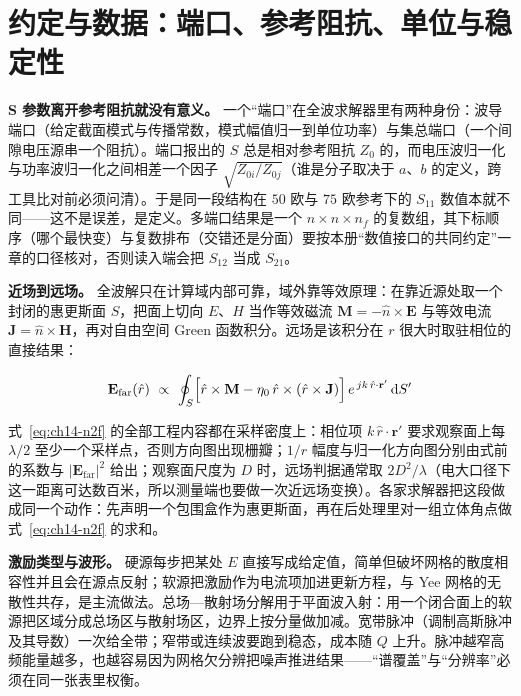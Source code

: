 \documentclass[12pt,a4paper,fontset=fandol]{ctexbook}
\begin{document}
\section{约定与数据：端口、参考阻抗、单位与稳定性}

\textbf{S 参数离开参考阻抗就没有意义。} 一个``端口''在全波求解器里有两种身份：波导端口（给定截面模式与传播常数，模式幅值归一到单位功率）与集总端口（一个间隙电压源串一个阻抗）。端口报出的 $S$ 总是相对参考阻抗 $Z_0$ 的，而电压波归一化与功率波归一化之间相差一个因子 $\sqrt{Z_{0i}/Z_{0j}}$（谁是分子取决于 $a$、$b$ 的定义，跨工具比对前必须问清）。于是同一段结构在 $50$ 欧与 $75$ 欧参考下的 $S_{11}$ 数值本就不同——这不是误差，是定义。多端口结果是一个 $n \times n \times n_f$ 的复数组，其下标顺序（哪个最快变）与复数排布（交错还是分面）要按本册``数值接口的共同约定''一章的口径核对，否则读入端会把 $S_{12}$ 当成 $S_{21}$。

\textbf{近场到远场。} 全波解只在计算域内部可靠，域外靠等效原理：在靠近源处取一个封闭的惠更斯面 $S$，把面上切向 $E$、$H$ 当作等效磁流 $\mathbf{M} = -\hat n \times \mathbf{E}$ 与等效电流 $\mathbf{J} = \hat n \times \mathbf{H}$，再对自由空间 Green 函数积分。远场是该积分在 $r$ 很大时取驻相位的直接结果：

\begin{equation}
\mathbf{E}_{\text{far}}(\hat r) \ \propto\ \oint_{S}
\Bigl[\hat r \times \mathbf{M}
- \eta_0\, \hat r \times (\hat r \times \mathbf{J})\Bigr]\,
e^{\,j k\, \hat r \cdot \mathbf{r}'}\, \mathrm{d}S'
\label{eq:ch14-n2f}
\end{equation}

式~\eqref{eq:ch14-n2f} 的全部工程内容都在采样密度上：相位项 $k\,\hat r \cdot \mathbf{r}'$ 要求观察面上每 $\lambda/2$ 至少一个采样点，否则方向图出现栅瓣；$1/r$ 幅度与归一化方向图分别由式前的系数与 $|\mathbf{E}_{\text{far}}|^{2}$ 给出；观察面尺度为 $D$ 时，远场判据通常取 $2D^{2}/\lambda$（电大口径下这一距离可达数百米，所以测量端也要做一次近远场变换）。各家求解器把这段做成同一个动作：先声明一个包围盒作为惠更斯面，再在后处理里对一组立体角点做式~\eqref{eq:ch14-n2f} 的求和。

\textbf{激励类型与波形。} 硬源每步把某处 $E$ 直接写成给定值，简单但破坏网格的散度相容性并且会在源点反射；软源把激励作为电流项加进更新方程，与 Yee 网格的无散性共存，是主流做法。总场—散射场分解用于平面波入射：用一个闭合面上的软源把区域分成总场区与散射场区，边界上按分量做加减。宽带脉冲（调制高斯脉冲及其导数）一次给全带；窄带或连续波要跑到稳态，成本随 $Q$ 上升。脉冲越窄高频能量越多，也越容易因为网格欠分辨把噪声推进结果——``谱覆盖''与``分辨率''必须在同一张表里权衡。
\end{document}
